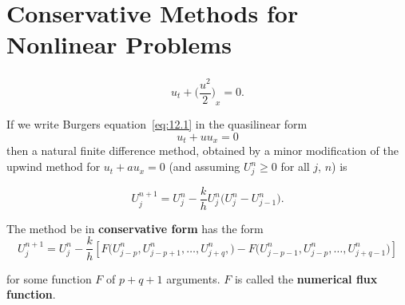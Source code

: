 \section{Conservative Methods for Nonlinear Problems}

\begin{frame}
    \frametitle{\secname}

    \begin{example}
        \begin{equation}\tag{12.1}\label{eq:12.1}
            u_{t}+
            {\bigg(\frac{u^{2}}{2}\bigg)}_{x}=
            0.
        \end{equation}
    \end{example}

    \begin{example}
        If we write Burgers equation~\eqref{eq:12.1} in the
        quasilinear form
        \begin{equation}\tag{12.3}\label{eq:12.3}
            u_{t}+
            uu_{x}=
            0
        \end{equation}
        then a natural finite difference method, obtained by a minor
        modification of the upwind method for
        \begin{math}
            u_{t}+
            au_{x}=
            0
        \end{math}
        (and assuming $U^{n}_{j}\geq 0$ for all $j$, $n$) is

        \begin{equation}\tag{12.4}\label{eq:12.4}
            U^{n+1}_{j}=
            U^{n}_{j}-
            \frac{k}{h}
            U^{n}_{j}
            \big(
            U^{n}_{j}-
            U^{n}_{j-1}
            \big).
        \end{equation}
    \end{example}

    \begin{definition}
        The method be in \textbf{conservative form} has the form
        \begin{equation}\tag{12.6}\label{eq:12.6}
            U^{n+1}_{j}=
            U^{n}_{j}-
            \frac{k}{h}
            \left[
                F
                \big(
                U^{n}_{j-p},
                U^{n}_{j-p+1},
                \dotsc,
                U^{n}_{j+q},
                \big)-
                F
                \big(
                U^{n}_{j-p-1},
                U^{n}_{j-p},
                \dotsc,
                U^{n}_{j+q-1}
                \big)
                \right]
        \end{equation}

        for some function $F$ of $p+q+1$ arguments.
        $F$ is called the \textbf{numerical flux function}.
    \end{definition}
\end{frame}

